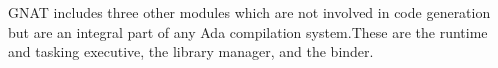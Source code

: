 %
%
%

GNAT includes three other modules which are not involved in code generation
but are an integral part of any Ada compilation system.These are the 
runtime and tasking executive,  the library manager, and the binder.





